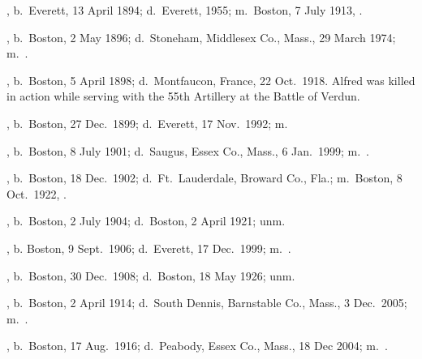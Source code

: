 \begin{Kids}
	, b.\ Everett, 13 April 1894;\cite{Robert5McGurinBirth} d.\ Everett, 1955;\cite{Robert5McGurinDeath} m.\ Boston, 7 July 1913, .\cite{Robert5McGurinMarriage}
	
	, b.\ Boston, 2 May 1896;\cite{Walter5McGurinBirth} d.\ Stoneham, Middlesex Co., Mass., 29 March 1974;\cite{Walter5McGurinDeath} m.\ .\cite{Walter5McGurinDeath}
	
	, b.\ Boston, 5 April 1898;\cite{Alfred5McGurinBirth} d.\ Montfaucon, France, 22 Oct.\ 1918.\cite{Alfred5McGurinDeath} Alfred was killed in action while serving with the 55th Artillery at the Battle of Verdun.\cite{Alfred5McGurinDeath2}
	
	, b.\ Boston, 27 Dec.\ 1899;\cite{Margaret5McGurinBirth} d.\ Everett, 17 Nov.\ 1992;\cite{Margaret5McGurinDeath} m.\ \cite{Margaret5McGurinDeath}
	
	, b.\ Boston, 8 July 1901;\cite{Sarah5McGurinBirth} d.\ Saugus, Essex Co., Mass., 6 Jan.\ 1999;\cite{Sarah5McGurinDeath} m.\ .\cite{Sarah5McGurinDeath}
	
	, b.\ Boston, 18 Dec.\ 1902;\cite{Edward5McGurinBirth} d.\ Ft.\ Lauderdale, Broward Co., Fla.;\cite{Edward5McGurinDeath} m.\ Boston, 8 Oct.\ 1922, .\cite{Edward5McGurinMarriage}
	
	, b.\ Boston, 2 July 1904;\cite{Caroline5McGurinBirth} d.\ Boston, 2 April 1921; unm.\cite{Caroline5McGurinDeath}
	
	, b. Boston, 9 Sept.\ 1906;\cite{Catherine5McGurinBirth} d.\ Everett, 17 Dec.\ 1999;\cite{Catherine5McGurinDeath} m.\ .\cite{Catherine5McGurinDeath}
	
	, b.\ Boston, 30 Dec.\ 1908;\cite{Josephine5McGurinBirth} d.\ Boston, 18 May 1926; unm.\cite{Josephine5McGurinDeath}
	
	, b.\ Boston, 2 April 1914;\cite{John5McGurinBirth} d.\ South Dennis, Barnstable Co., Mass., 3 Dec.\ 2005;\cite{John5McGurinDeath} m.\ .\cite{John5McGurinDeath}
	
	, b.\ Boston, 17 Aug.\ 1916;\cite{Charles5McGurinBirth} d.\ Peabody, Essex Co., Mass., 18 Dec 2004;\cite{Charles5McGurinDeath} m.\ .\cite{Charles5McGurinDeath}
\end{Kids}